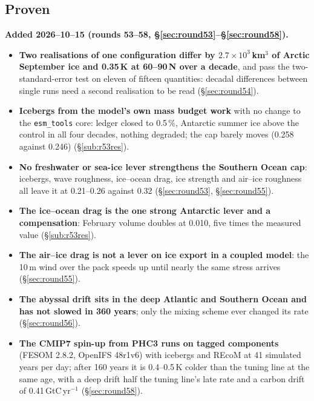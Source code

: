 \documentclass[10pt]{article}
\begin{document}
\subsection{Proven}\label{sub:proven}
\textbf{Added 2026--10--15 (rounds 53--58, \S\ref{sec:round53}--\S\ref{sec:round58}).}
\begin{itemize}\itemsep2pt
\item \textbf{Two realisations of one configuration differ by $2.7\times10^3$\,km$^3$ of Arctic September
ice and 0.35\,K at 60--90\,N over a decade}, and pass the two-standard-error test on eleven of fifteen
quantities: decadal differences between single runs need a second realisation to be read
(\S\ref{sec:round54}).
\item \textbf{Icebergs from the model's own mass budget work} with no change to the \texttt{esm\_tools}
core: ledger closed to 0.5\,\%, Antarctic summer ice above the control in all four decades, nothing
degraded; the cap barely moves (0.258 against 0.246) (\S\ref{sub:r53res}).
\item \textbf{No freshwater or sea-ice lever strengthens the Southern Ocean cap}: icebergs, wave roughness,
ice--ocean drag, ice strength and air--ice roughness all leave it at 0.21--0.26 against 0.32
(\S\ref{sec:round53}, \S\ref{sec:round55}).
\item \textbf{The ice--ocean drag is the one strong Antarctic lever and a compensation}: February volume
doubles at 0.010, five times the measured value (\S\ref{sub:r53res}).
\item \textbf{The air--ice drag is not a lever on ice export in a coupled model}: the 10\,m wind over the
pack speeds up until nearly the same stress arrives (\S\ref{sec:round55}).
\item \textbf{The abyssal drift sits in the deep Atlantic and Southern Ocean and has not slowed in 360
years}; only the mixing scheme ever changed its rate (\S\ref{sec:round56}).
\item \textbf{The CMIP7 spin-up from PHC3 runs on tagged components} (FESOM 2.8.2, OpenIFS 48r1v6) with
icebergs and REcoM at 41 simulated years per day; after 160 years it is 0.4--0.5\,K colder than the tuning
line at the same age, with a deep drift half the tuning line's late rate and a carbon drift of
0.41\,GtC\,yr$^{-1}$ (\S\ref{sec:round58}).
\end{itemize}
\end{document}
